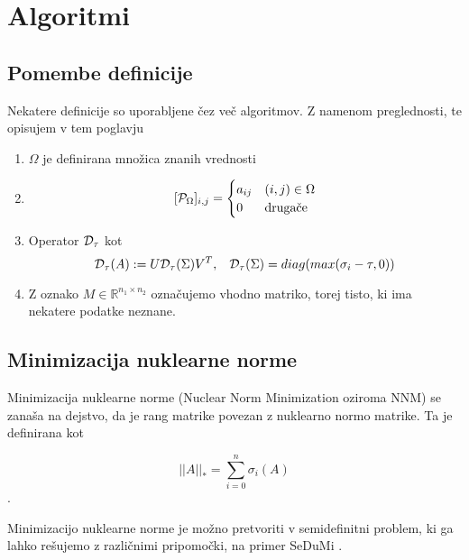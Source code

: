 \chapter{Algoritmi}


\section{Pomembe definicije}
Nekatere definicije so uporabljene čez več algoritmov. Z namenom preglednosti, te opisujem v tem poglavju
\begin{enumerate}
  \item $\Omega$ je definirana množica znanih vrednosti
  \item \[ [\mathcal{P}_\Omega]_{i,j} = \begin{cases}
            a_{ij} & (i, j) \in \Omega \\
            0      & \textrm{drugače}
          \end{cases}
        \]
  \item Operator $\mathcal{D}_\tau$ kot \[
            \mathcal{D}_\tau(A) := U \mathcal{D}_\tau(\Sigma) V^T, \hspace{0.3cm} \mathcal{D}_\tau(\Sigma) = diag(max(\sigma_i - \tau, 0))
        \] \cite{CCS}
  \item Z oznako $M \in \mathbb{R}^{n_1 \times n_2}$ označujemo vhodno matriko, torej tisto, ki ima nekatere podatke neznane.
\end{enumerate}

\section{Minimizacija nuklearne norme}
Minimizacija nuklearne norme (Nuclear Norm Minimization oziroma NNM) se zanaša na dejstvo, da je rang matrike povezan z nuklearno normo matrike. Ta je definirana kot

\[
  ||A||_* = \sum_{i = 0}^{n} \sigma_i(A)
\].

Minimizacijo nuklearne norme je možno pretvoriti v semidefinitni problem, ki ga lahko rešujemo z različnimi pripomočki, na primer SeDuMi \cite{SeDuMi}.

